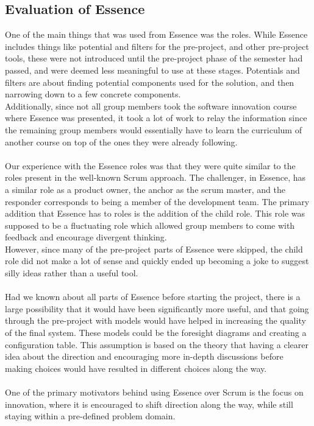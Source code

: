 \subsection{Evaluation of Essence}
One of the main things that was used from Essence was the roles.
While Essence includes things like potential and filters for the pre-project, and other pre-project tools, these were not introduced until the pre-project phase of the semester had passed, and were deemed less meaningful to use at these stages.
Potentials and filters are about finding potential components used for the solution, and then narrowing down to a few concrete components.\\
Additionally, since not all group members took the software innovation course where Essence was presented, it took a lot of work to relay the information since the remaining group members would essentially have to learn the curriculum of another course on top of the ones they were already following.
\\\\
Our experience with the Essence roles was that they were quite similar to the roles present in the well-known Scrum approach.
The challenger, in Essence, has a similar role as a product owner, the anchor as the scrum master, and the responder corresponds to being a member of the development team.
The primary addition that Essence has to roles is the addition of the child role.
This role was supposed to be a fluctuating role which allowed group members to come with feedback and encourage divergent thinking.\\
However, since many of the pre-project parts of Essence were skipped, the child role did not make a lot of sense and quickly ended up becoming a joke to suggest silly ideas rather than a useful tool.
\\\\
Had we known about all parts of Essence before starting the project, there is a large possibility that it would have been significantly more useful, and that going through the pre-project with models would have helped in increasing the quality of the final system.
These models could be the foresight diagrams and creating a configuration table.
This assumption is based on the theory that having a clearer idea about the direction and encouraging more in-depth discussions before making choices would have resulted in different choices along the way.
\\\\
One of the primary motivators behind using Essence over Scrum is the focus on innovation, where it is encouraged to shift direction along the way, while still staying within a pre-defined problem domain.
